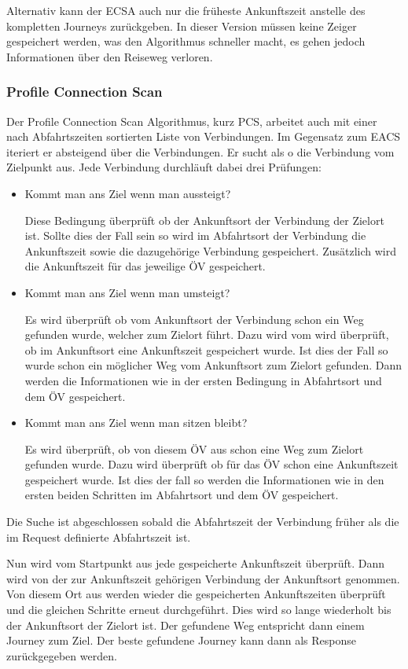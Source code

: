 Alternativ kann der ECSA auch nur die früheste Ankunftszeit anstelle des kompletten Journeys zurückgeben. In dieser Version müssen keine Zeiger gespeichert werden, was den Algorithmus schneller macht, es gehen jedoch Informationen über den Reiseweg verloren.

\subsubsection{Profile Connection Scan}
Der Profile Connection Scan Algorithmus, kurz PCS, arbeitet auch mit einer nach Abfahrtszeiten sortierten Liste von Verbindungen. Im Gegensatz zum EACS iteriert er absteigend über die Verbindungen. Er sucht als o die Verbindung vom Zielpunkt aus. Jede Verbindung durchläuft dabei drei Prüfungen:

\begin{itemize}
	\item Kommt man ans Ziel wenn man aussteigt?
	
	Diese Bedingung überprüft ob der Ankunftsort der Verbindung der Zielort ist. Sollte dies der Fall sein so wird im Abfahrtsort der Verbindung die Ankunftszeit sowie die dazugehörige Verbindung gespeichert. Zusätzlich wird die Ankunftszeit für das jeweilige ÖV gespeichert.
	\item Kommt man ans Ziel wenn man umsteigt?
	
	Es wird überprüft ob vom Ankunftsort der Verbindung schon ein Weg gefunden wurde, welcher zum Zielort führt. Dazu wird vom wird überprüft, ob im Ankunftsort eine Ankunftszeit gespeichert wurde. Ist dies der Fall so wurde schon ein möglicher Weg vom Ankunftsort zum Zielort gefunden. Dann werden die Informationen wie in der ersten Bedingung in Abfahrtsort und dem ÖV gespeichert.
	\item Kommt man ans Ziel wenn man sitzen bleibt?
	
	Es wird überprüft, ob von diesem ÖV aus schon eine Weg zum Zielort gefunden wurde. Dazu wird überprüft ob für das ÖV schon eine Ankunftszeit gespeichert wurde. Ist dies der fall so werden die Informationen wie in den ersten beiden Schritten im Abfahrtsort und dem ÖV gespeichert.
\end{itemize}
Die Suche ist abgeschlossen sobald die Abfahrtszeit der Verbindung früher als die im Request definierte Abfahrtszeit ist. 

Nun wird vom Startpunkt aus jede gespeicherte Ankunftszeit überprüft. Dann wird von der zur Ankunftszeit gehörigen Verbindung der Ankunftsort genommen. Von diesem Ort aus werden wieder die gespeicherten Ankunftszeiten überprüft und die gleichen Schritte erneut durchgeführt. Dies wird so lange wiederholt bis der Ankunftsort der Zielort ist. Der gefundene Weg entspricht dann einem Journey zum Ziel. Der beste gefundene Journey kann dann als Response zurückgegeben werden. 

